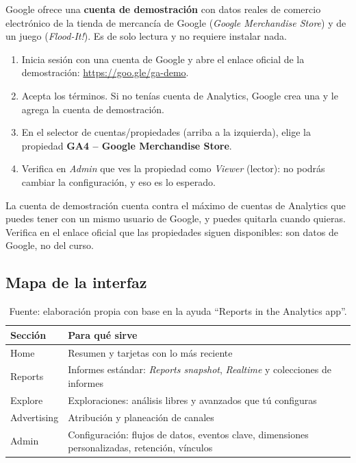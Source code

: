 \documentclass[11pt,letterpaper]{article}
\begin{document}
Google ofrece una \textbf{cuenta de demostración} con datos reales de comercio electrónico de la tienda de mercancía de Google (\emph{Google Merchandise Store}) y de un juego (\emph{Flood-It!}).
Es de solo lectura y no requiere instalar nada.

\begin{cajaPasos}
\begin{enumerate}[nosep,label=\arabic*.]
  \item Inicia sesión con una cuenta de Google y abre el enlace oficial de la demostración: \url{https://goo.gle/ga-demo}.
  \item Acepta los términos. Si no tenías cuenta de Analytics, Google crea una y le agrega la cuenta de demostración.
  \item En el selector de cuentas/propiedades (arriba a la izquierda), elige la propiedad \textbf{GA4 -- Google Merchandise Store}.
  \item Verifica en \emph{Admin} que ves la propiedad como \emph{Viewer} (lector): no podrás cambiar la configuración, y eso es lo esperado.
\end{enumerate}
\end{cajaPasos}

\begin{cajaAtencion}
La cuenta de demostración cuenta contra el máximo de cuentas de Analytics que puedes tener con un mismo usuario de Google, y puedes quitarla cuando quieras. Verifica en el enlace oficial
que las propiedades siguen disponibles: son datos de Google, no del curso.
\end{cajaAtencion}

\subsection{Mapa de la interfaz}

\begin{table}[h]
\centering
\begin{tabular}{@{}p{3.2cm}p{11.3cm}@{}}
\toprule
\textbf{Sección} & \textbf{Para qué sirve} \\
\midrule
Home & Resumen y tarjetas con lo más reciente \\
Reports & Informes estándar: \emph{Reports snapshot}, \emph{Realtime} y colecciones de informes \\
Explore & Exploraciones: análisis libres y avanzados que tú configuras \\
Advertising & Atribución y planeación de canales \\
Admin & Configuración: flujos de datos, eventos clave, dimensiones personalizadas, retención, vínculos \\
\bottomrule
\end{tabular}
\caption*{Fuente: elaboración propia con base en la ayuda \enquote{Reports in the Analytics app}.}
\end{table}
\end{document}

